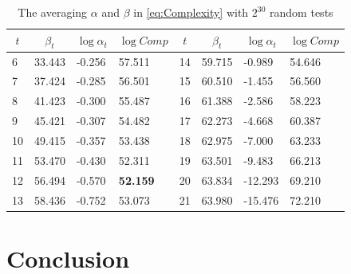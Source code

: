 \begin{table}[htbp]
  \centering
  \caption{The averaging $\alpha$ and $\beta$ in \eqref{eq:Complexity} with $2^{30}$ random tests}\label{tab:ZhangAlphaAndBetaOriginal}
    \begin{tabular}{|l|l|l|l|l|l|l|l|}
    \hline
    \multicolumn{1}{|c|}{$t$} & \multicolumn{1}{c|}{$\beta_t$} & \multicolumn{1}{c|}{$\log\alpha_t$} & \multicolumn{1}{c|}{$\log Comp$} & \multicolumn{1}{c|}{$t$} & \multicolumn{1}{c|}{$\beta_t$} & \multicolumn{1}{c|}{$\log\alpha_t$} & \multicolumn{1}{c|}{$\log Comp$} \\
    \hline

    6    & 33.443 & -0.256 & 57.511 & 14    & 59.715 & -0.989 &  54.646\\
    \hline
    7    & 37.424 & -0.285 & 56.501 & 15    & 60.510 & -1.455 &  56.560\\
    \hline
    8    & 41.423 & -0.300 & 55.487 & 16    & 61.388 & -2.586 &  58.223\\
    \hline
    9    & 45.421  & -0.307 & 54.482 & 17    & 62.273 & -4.668 &  60.387\\
    \hline
    10   & 49.415 & -0.357  & 53.438 & 18    & 62.975 & -7.000 &  63.233\\
    \hline
    11    & 53.470 & -0.430 & 52.311 & 19    & 63.501 & -9.483 &  66.213\\
    \hline
    12    & 56.494 & -0.570 & \textbf{52.159} & 20    & 63.834 & -12.293 &  69.210\\
    \hline
    13    & 58.436 & -0.752 & 53.073 & 21    & 63.980 & -15.476 &  72.210\\
    \hline
    \end{tabular}%
\end{table}%



\section{Conclusion}





\ifLNCSVER
  
\else
  
\fi





\ifLNCSVER

\else

\fi






